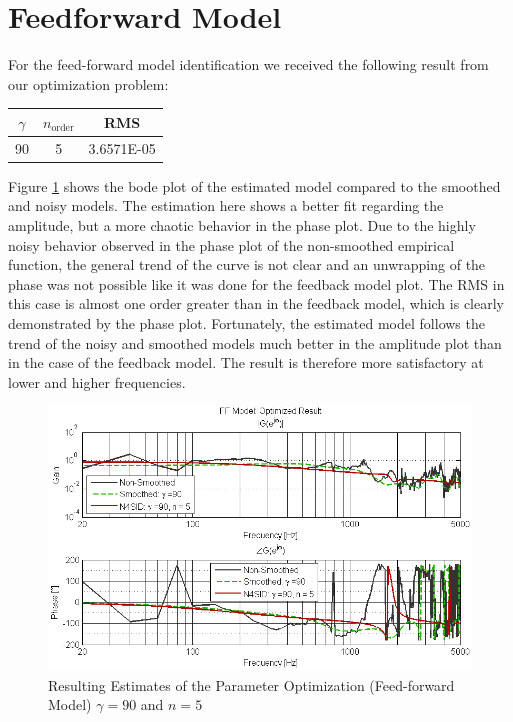 \section{Feedforward Model}
For the feed-forward model identification we received the following result from our optimization problem:

\begin{table}[H]
\centering
\begin{tabular}{c|c|c}
$\gamma$ & $n_\text{order}$ & RMS \\ \hline
90 & 5 & 3.6571E-05 \\ 
\end{tabular}
\end{table}

Figure \ref{fig:results_FF} shows the bode plot of the estimated model compared to the smoothed and noisy models. The estimation here shows a better fit regarding the amplitude, but a more chaotic behavior in the phase plot. Due to the highly noisy behavior observed in the phase plot of the non-smoothed empirical function, the general trend of the curve is not clear and an unwrapping of the phase was not possible like it was done for the feedback model plot. The RMS in this case is almost one order greater than in the feedback model, which is clearly demonstrated by the phase plot. Fortunately, the estimated model follows the trend of the noisy and smoothed models much better in the amplitude plot than in the case of the feedback model. The result is therefore more satisfactory at lower and higher frequencies.\\

\begin{figure}[h]
\centering
\includegraphics[width=1.0\textwidth]{pics/results_FF}
\caption{Resulting Estimates of the Parameter Optimization (Feed-forward Model) $\gamma = 90$ and $n = 5$}
\label{fig:results_FF}
\end{figure}


